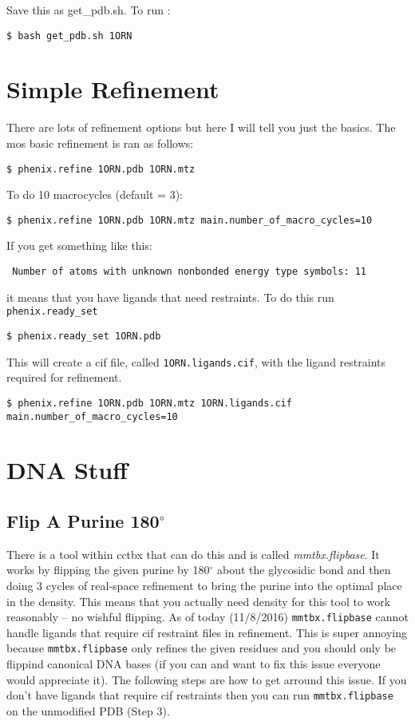 \documentclass[12pt]{article}
\newcommand{\cmdline}[1]{\vspace{5mm} \noindent
\texttt{\$ #1}
\vspace{5mm}

}
\begin{document}
\noindent
Save this as get\_pdb.sh. To run :  

  \vspace{-6mm}
  \cmdline{bash get\_pdb.sh 1ORN}


\section{Simple Refinement}
There are lots of refinement options but here I will tell you just the basics. The mos basic refinement is ran as follows:

\vspace{-6mm}
\cmdline{phenix.refine 1ORN.pdb 1ORN.mtz}

\noindent
To do 10 macrocycles (default = 3):

\vspace{-6mm}
\cmdline{phenix.refine 1ORN.pdb 1ORN.mtz main.number\_of\_macro\_cycles=10}

\noindent
If you get something like this:

\vspace{3mm}
\texttt{  Number of atoms with unknown nonbonded energy type symbols: 11}
\vspace{3mm}

\noindent
it means that you have ligands that need restraints. To do this run \texttt{phenix.ready\_set}

\vspace{-6mm}
\cmdline{phenix.ready\_set 1ORN.pdb}

\noindent
This will create a cif file, called \texttt{1ORN.ligands.cif}, with the ligand restraints required for refinement.

\vspace{-6mm}
\cmdline{phenix.refine 1ORN.pdb 1ORN.mtz 1ORN.ligands.cif\\
main.number\_of\_macro\_cycles=10}


\section{DNA Stuff}
\subsection{Flip A Purine 180$^{\circ}$}
There is a tool within cctbx that can do this and is called \textit{mmtbx.flipbase}. It works by flipping the given purine by 180$^{\circ}$ about the glycosidic bond and then doing 3 cycles of real-space refinement to bring the purine into the optimal place in the density. This means that you actually need density for this tool to work reasonably -- no wishful flipping. As of today (11/8/2016) \texttt{mmtbx.flipbase} cannot handle ligands that require cif restraint files in refinement. This is super annoying because \texttt{mmtbx.flipbase} only refines the given residues and you should only be flippind canonical DNA bases (if you can and want to fix this issue everyone would appreciate it). The following steps are how to get arround this issue. If you don't have ligands that require cif restraints then you can run \texttt{mmtbx.flipbase} on the unmodified PDB (Step 3).
\end{document}

